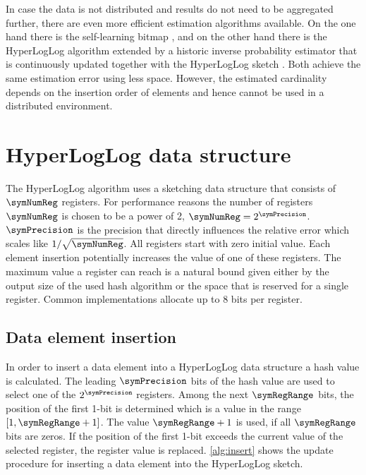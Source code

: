 \documentclass[a4paper]{scrartcl}
\begin{document}
In case the data is not distributed and results do not need to be aggregated further, there are even more efficient estimation algorithms available. On the one hand there is the self-learning bitmap \cite{Chen2011, Chen2015}, and on the other hand there is the HyperLogLog algorithm extended by a historic inverse probability estimator that is continuously updated together with the HyperLogLog sketch \cite{Ting2014}. Both achieve the same estimation error using less space. However, the estimated cardinality depends on the insertion order of elements and hence cannot be used in a distributed environment. 


\section{HyperLogLog data structure}
The HyperLogLog algorithm uses a sketching data structure that consists of $\symNumReg$ registers. For performance reasons the number of registers $\symNumReg$ is chosen to be a power of 2, $\symNumReg = 2^\symPrecision$. $\symPrecision$ is the precision that directly influences the relative error which scales like $1/\sqrt{\symNumReg}$. All registers start with zero initial value. Each element insertion potentially increases the value of one of these registers. The maximum value a register can reach is a natural bound given either by the output size of the used hash algorithm or the space that is reserved for a single register. Common implementations allocate up to 8 bits per register.

\subsection{Data element insertion}
\label{sec:data_element_insertion}
In order to insert a data element into a HyperLogLog data structure a hash value is calculated. The leading $\symPrecision$ bits of the hash value are used to select one of the $2^\symPrecision$ registers. Among the next $\symRegRange$ bits, the position of the first 1-bit is determined which is a value in the range $[1,\symRegRange+1]$. The value $\symRegRange+1$ is used, if all $\symRegRange$ bits are zeros. If the position of the first 1-bit exceeds the current value of the selected register, the register value is replaced. \cref{alg:insert} shows the update procedure for inserting a data element into the HyperLogLog sketch.
\end{document}
